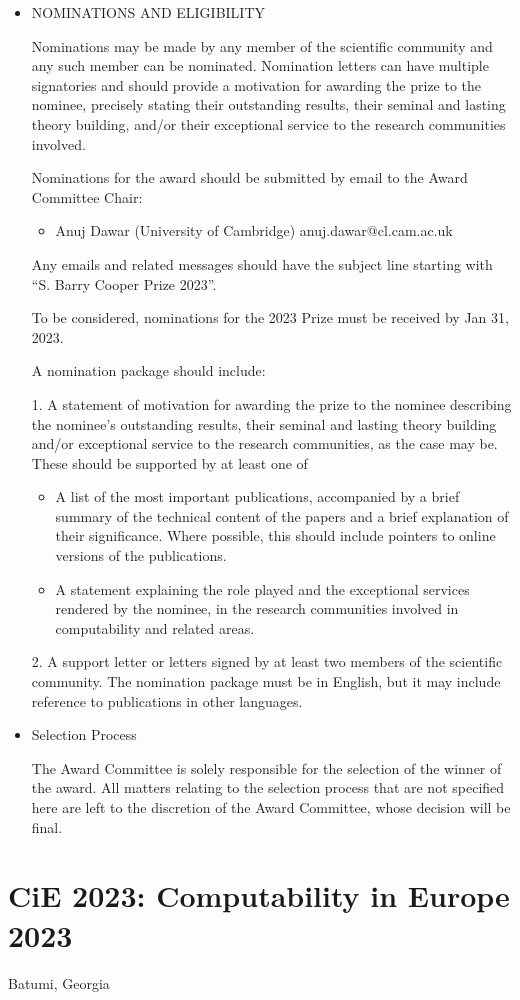 \documentclass[prodmode,acmtecs]{acmsmall} %
\begin{document}
\begin{itemize}\item  NOMINATIONS AND ELIGIBILITY 
 
  Nominations may be made by any member of the scientific community and any such member can be nominated. Nomination letters can have multiple signatories and should provide a motivation for awarding the prize to the nominee, precisely stating their outstanding results, their seminal and lasting theory building, and/or their exceptional service to the research communities involved. 
 
  Nominations for the award should be submitted by email to the Award Committee Chair: 
 
\begin{itemize}\item  Anuj Dawar (University of Cambridge) anuj.dawar@cl.cam.ac.uk
\end{itemize} 
  Any emails and related messages should have the subject line starting with “S. Barry Cooper Prize 2023”. 
 
  To be considered, nominations for the 2023 Prize must be received by Jan 31, 2023. 
 
  A nomination package should include: 
 
  1. A statement of motivation for awarding the prize to the nominee describing the nominee’s outstanding results, their seminal and lasting theory building and/or exceptional service to the research communities, as the case may be. These should be supported by at least one of 
 
\begin{itemize}\item  A list of the most important publications, accompanied by a brief summary of the technical content of the papers and a brief explanation of their significance. Where possible, this should include pointers to online versions of the publications.
\item  A statement explaining the role played and the exceptional services rendered by the nominee, in the research communities involved in computability and related areas.
\end{itemize} 
  2. A support letter or letters signed by at least two members of the scientific community. The nomination package must be in English, but it may include reference to publications in other languages. 
 
\item  Selection Process 
 
  The Award Committee is solely responsible for the selection of the winner of the award. All matters relating to the selection process that are not specified here are left to the discretion of the Award Committee, whose decision will be final. 
 
\end{itemize}\section{CiE 2023: Computability in Europe 2023}\label{CiE2023}  Batumi, Georgia\\ 
\end{document}
